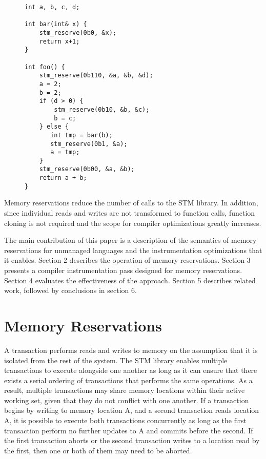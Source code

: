 \documentclass[preprint]{sigplanconf}
\begin{document}
\begin{figure}[h]
\begin{lstlisting}[caption={STM instrumentation with memory reservations},label=listing3,captionpos=b]
int a, b, c, d;

int bar(int& x) {
    stm_reserve(0b0, &x);
    return x+1;
}

int foo() {
    stm_reserve(0b110, &a, &b, &d);
    a = 2;
    b = 2;
    if (d > 0) {
        stm_reserve(0b10, &b, &c);
        b = c;
    } else {
       int tmp = bar(b);
       stm_reserve(0b1, &a);
       a = tmp;
    }
    stm_reserve(0b00, &a, &b);
    return a + b;
}
\end{lstlisting}
\end{figure}

Memory reservations reduce the number of calls to the STM library. In addition, since individual reads and writes are not transformed to function calls, function cloning is not required and the scope for compiler optimizations greatly increases.

The main contribution of this paper is a description of the semantics of memory reservations for unmanaged languages and the instrumentation optimizations that it enables. Section 2 describes the operation of memory reservations. Section 3 presents a compiler instrumentation pass designed for memory reservations. Section 4 evaluates the effectiveness of the approach. Section 5 describes related work, followed by conclusions in section 6.

\section{Memory Reservations}

A transaction performs reads and writes to memory on the assumption that it is isolated from the rest of the system. The STM library enables multiple transactions to execute alongside one another as long as it can ensure that there exists a serial ordering of transactions that performs the same operations. As a result, multiple transactions may share memory locations within their active working set, given that they do not conflict with one another. If a transaction begins by writing to memory location A, and a second transaction reads location A, it is possible to execute both transactions concurrently as long as the first transaction perform no further updates to A and commits before the second. If the first transaction aborts or the second transaction writes to a location read by the first, then one or both of them may need to be aborted.
\end{document}
